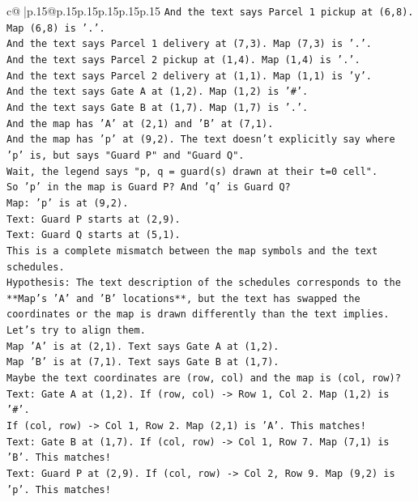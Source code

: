 \documentclass{article}
\begin{document}
{\begin{supertabular}{c@{$\;$}|p{.15\linewidth}@{}p{.15\linewidth}p{.15\linewidth}p{.15\linewidth}p{.15\linewidth}p{.15\linewidth}}
{{{\texttt{And the text says Parcel 1 pickup at (6,8). Map (6,8) is '.'.} \\
\texttt{And the text says Parcel 1 delivery at (7,3). Map (7,3) is '.'.} \\
\texttt{And the text says Parcel 2 pickup at (1,4). Map (1,4) is '.'.} \\
\texttt{And the text says Parcel 2 delivery at (1,1). Map (1,1) is 'y'.} \\
\texttt{And the text says Gate A at (1,2). Map (1,2) is '\#'.} \\
\texttt{And the text says Gate B at (1,7). Map (1,7) is '.'.} \\
\texttt{And the map has 'A' at (2,1) and 'B' at (7,1).} \\
\texttt{And the map has 'p' at (9,2). The text doesn't explicitly say where 'p' is, but says "Guard P" and "Guard Q".} \\
\texttt{Wait, the legend says "p, q = guard(s) drawn at their t=0 cell".} \\
\texttt{So 'p' in the map is Guard P? And 'q' is Guard Q?} \\
\texttt{Map: 'p' is at (9,2).} \\
\texttt{Text: Guard P starts at (2,9).} \\
\texttt{Text: Guard Q starts at (5,1).} \\
\texttt{This is a complete mismatch between the map symbols and the text schedules.} \\
\texttt{Hypothesis: The text description of the schedules corresponds to the **Map's 'A' and 'B' locations**, but the text has swapped the coordinates or the map is drawn differently than the text implies.} \\
\texttt{Let's try to align them.} \\
\texttt{Map 'A' is at (2,1). Text says Gate A at (1,2).} \\
\texttt{Map 'B' is at (7,1). Text says Gate B at (1,7).} \\
\texttt{Maybe the text coordinates are (row, col) and the map is (col, row)?} \\
\texttt{Text: Gate A at (1,2). If (row, col) {-}> Row 1, Col 2. Map (1,2) is '\#'.} \\
\texttt{If (col, row) {-}> Col 1, Row 2. Map (2,1) is 'A'. This matches!} \\
\texttt{Text: Gate B at (1,7). If (col, row) {-}> Col 1, Row 7. Map (7,1) is 'B'. This matches!} \\
\texttt{Text: Guard P at (2,9). If (col, row) {-}> Col 2, Row 9. Map (9,2) is 'p'. This matches!} \\
}}}
\end{supertabular}}
\end{document}
